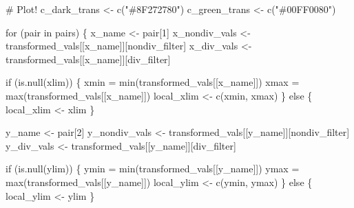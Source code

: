 \documentclass[
  letterpaper,
  DIV=11,
  numbers=noendperiod]{scrartcl}
\newenvironment{Shaded}{\begin{snugshade}}{\end{snugshade}}
\newcommand{\BuiltInTok}[1]{\textcolor[rgb]{0.00,0.23,0.31}{#1}}
\newcommand{\CommentTok}[1]{\textcolor[rgb]{0.37,0.37,0.37}{#1}}
\newcommand{\ControlFlowTok}[1]{\textcolor[rgb]{0.00,0.23,0.31}{#1}}
\newcommand{\DecValTok}[1]{\textcolor[rgb]{0.68,0.00,0.00}{#1}}
\newcommand{\KeywordTok}[1]{\textcolor[rgb]{0.00,0.23,0.31}{#1}}
\newcommand{\NormalTok}[1]{\textcolor[rgb]{0.00,0.23,0.31}{#1}}
\newcommand{\OperatorTok}[1]{\textcolor[rgb]{0.37,0.37,0.37}{#1}}
\newcommand{\StringTok}[1]{\textcolor[rgb]{0.13,0.47,0.30}{#1}}
\begin{document}
\begin{Shaded}
\begin{Highlighting}[]
  \CommentTok{\# Plot!}
\NormalTok{  c\_dark\_trans }\OperatorTok{\textless{}{-}}\NormalTok{ c(}\StringTok{"\#8F272780"}\NormalTok{)}
\NormalTok{  c\_green\_trans }\OperatorTok{\textless{}{-}}\NormalTok{ c(}\StringTok{"\#00FF0080"}\NormalTok{)}
  
  \ControlFlowTok{for}\NormalTok{ (pair }\KeywordTok{in}\NormalTok{ pairs) \{}
\NormalTok{    x\_name }\OperatorTok{\textless{}{-}}\NormalTok{ pair[}\DecValTok{1}\NormalTok{]}
\NormalTok{    x\_nondiv\_vals }\OperatorTok{\textless{}{-}}\NormalTok{ transformed\_vals[[x\_name]][nondiv\_filter]}
\NormalTok{    x\_div\_vals    }\OperatorTok{\textless{}{-}}\NormalTok{ transformed\_vals[[x\_name]][div\_filter]}
    
    \ControlFlowTok{if}\NormalTok{ (}\KeywordTok{is}\NormalTok{.null(xlim)) \{}
\NormalTok{      xmin }\OperatorTok{=} \BuiltInTok{min}\NormalTok{(transformed\_vals[[x\_name]])}
\NormalTok{      xmax }\OperatorTok{=} \BuiltInTok{max}\NormalTok{(transformed\_vals[[x\_name]])}
\NormalTok{      local\_xlim }\OperatorTok{\textless{}{-}}\NormalTok{ c(xmin, xmax)}
\NormalTok{    \} }\ControlFlowTok{else}\NormalTok{ \{}
\NormalTok{      local\_xlim }\OperatorTok{\textless{}{-}}\NormalTok{ xlim}
\NormalTok{    \}}
    
\NormalTok{    y\_name }\OperatorTok{\textless{}{-}}\NormalTok{ pair[}\DecValTok{2}\NormalTok{]}
\NormalTok{    y\_nondiv\_vals }\OperatorTok{\textless{}{-}}\NormalTok{ transformed\_vals[[y\_name]][nondiv\_filter]}
\NormalTok{    y\_div\_vals    }\OperatorTok{\textless{}{-}}\NormalTok{ transformed\_vals[[y\_name]][div\_filter]}
    
    \ControlFlowTok{if}\NormalTok{ (}\KeywordTok{is}\NormalTok{.null(ylim)) \{}
\NormalTok{      ymin }\OperatorTok{=} \BuiltInTok{min}\NormalTok{(transformed\_vals[[y\_name]])}
\NormalTok{      ymax }\OperatorTok{=} \BuiltInTok{max}\NormalTok{(transformed\_vals[[y\_name]])}
\NormalTok{      local\_ylim }\OperatorTok{\textless{}{-}}\NormalTok{ c(ymin, ymax)}
\NormalTok{    \} }\ControlFlowTok{else}\NormalTok{ \{}
\NormalTok{      local\_ylim }\OperatorTok{\textless{}{-}}\NormalTok{ ylim}
\NormalTok{    \}}
 

\end{Highlighting}
\end{Shaded}
\end{document}
